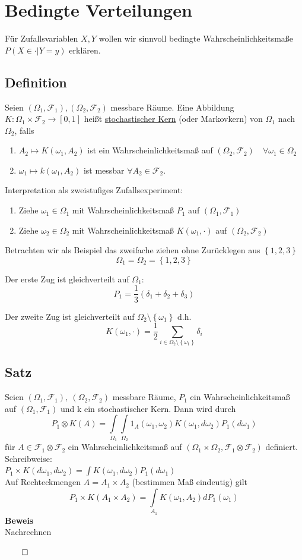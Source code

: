 \documentclass[german,10pt,oneside, fleqn, a4paper]{article}
\newcommand{\ra}{\rightarrow}
\newcommand{\sm}[2][\infty]{\sum\limits_{#2}^{#1}}
\newcommand{\brac}[1]{\left\lbrace #1\right\rbrace}
\newcommand{\QED}{\begin{flushright}$\qed$\end{flushright}}
\newcommand{\mc}[1]{\mathcal{#1}}
\newcommand{\beweis}{\textbf{Beweis}\\}
\newcommand{\1}[1]{1_{#1}}
\newcommand{\2}[1]{\1{\brac{#1}}}
\newcommand{\f}{\mc{F}}
\newcommand{\qf}{\quad\forall}
\begin{document}
\section{Bedingte Verteilungen}
Für Zufallsvariablen $X,Y$ wollen wir sinnvoll bedingte Wahrscheinlichkeitsmaße $P(X\in\cdot|Y=y)$ erklären.

\subsection{Definition}
\label{7.1}
Seien $(\Omega_1,\f_1),(\Omega_2,\f_2)$ messbare Räume. Eine Abbildung\\
$K:\Omega_1\times\f_2\ra [0,1]$ heißt \underline{stochastischer Kern} (oder Markovkern) von $\Omega_1$ nach $\Omega_2$, falls\begin{enumerate}[label=(\roman*)]
\item $A_2\mapsto K(\omega_1,A_2)$ ist ein Wahrscheinlichkeitsmaß auf $(\Omega_2,\f_2)\qf\omega_1\in\Omega_2$
\item $\omega_1\mapsto k(\omega_1,A_2)$ ist messbar $\forall A_2\in\f_2$.
\end{enumerate}
Interpretation als zweistufiges Zufallsexperiment:\begin{enumerate}
\item Ziehe $\omega_1\in\Omega_1$ mit Wahrscheinlichkeitsmaß $P_1$ auf $(\Omega_1,\f_1)$
\item Ziehe $\omega_2\in\Omega_2$ mit Wahrscheinlichkeitsmaß $K(\omega_1,\cdot)$ auf $(\Omega_2,\f_2)$
\end{enumerate}
Betrachten wir als Beispiel das zweifache ziehen ohne Zurücklegen aus $\brac{1,2,3}$\[
 \Omega_1=\Omega_2=\brac{1,2,3}\]\begin{list}{•}{}
 \item Der erste Zug ist gleichverteilt auf $\Omega_1$:\[
 P_1=\dfrac{1}{3}(\delta_1+\delta_2+\delta_3)\]
 \item Der zweite Zug ist gleichverteilt auf $\Omega_2\setminus\brac{\omega_1}$ d.h.\[
K(\omega_1,\cdot)=\dfrac{1}{2}\sm[]{i\in\Omega_2\setminus\brac{\omega_1}}\delta_i\]
 \end{list}
 
 \subsection{Satz}
 \label{7.2}
 Seien $(\Omega_1,\f_1),\ (\Omega_2,\f_2)$ messbare Räume, $P_1$ ein Wahrscheinlichkeitsmaß auf $(\Omega_1,\f_1)$ und k ein stochastischer Kern. Dann wird durch\[
P_1\otimes K(A)=\int\limits_{\Omega_1}\int\limits_{\Omega_2}1_A(\omega_1,\omega_2)K(\omega_1,d\omega_2)P_1(d\omega_1) 
 \]
 für $A\in\f_1\otimes\f_2$ ein Wahrscheinlichkeitsmaß auf $(\Omega_1\times\Omega_2,\f_1\otimes\f_2)$ definiert.\\
 Schreibweise:\\
 $P_1\times K(d\omega_1,d\omega_2)=\int K(\omega_1,d\omega_2)P_1(d\omega_1)$\\
 Auf Rechteckmengen $A=A_1\times A_2$ (bestimmen Maß eindeutig) gilt \[
P_1\times K(A_1\times A_2)=\int\limits_{A_1}K(\omega_1,A_2)dP_1(\omega_1)
 \]
 \beweis
 Nachrechnen\QED
\end{document}
